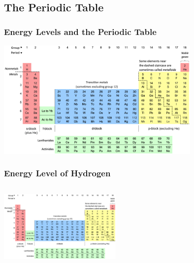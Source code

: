 \documentclass{beamer}
\begin{document}
\subsection{The Periodic Table}

\begin{frame}
    \frametitle{Energy Levels and the Periodic Table}
    \includegraphics[width=10cm]{../../../../public/images/pTable.png}
\end{frame}

\begin{frame}
    \frametitle{Energy Level of Hydrogen}
    \begin{columns}
        
        \begin{column}{0.5\textwidth}
            \includegraphics[width=6cm]{../../../../public/images/pTable.png}
            
        \end{column}
        \begin{column}{0.5\textwidth}

            
        \end{column}
    \end{columns}

\end{frame}
\end{document}
